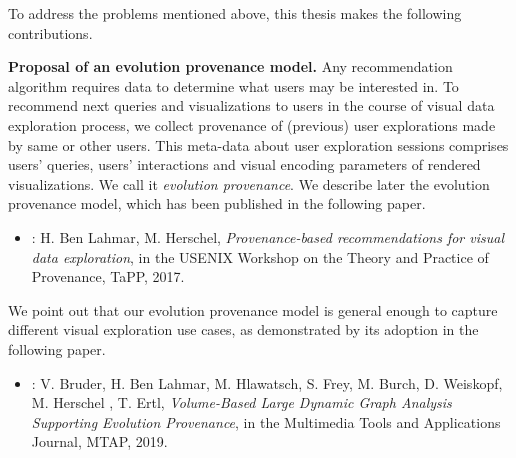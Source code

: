 
To address the problems mentioned above, this thesis makes the following contributions.

\bigskip 
\noindent \textbf{Proposal of an evolution provenance model.} 
Any recommendation algorithm requires data to determine what users may be interested in. To recommend next queries and visualizations to users in the course of visual data exploration process, we collect provenance of (previous) user explorations made by same or other users. 
This meta-data about user exploration sessions comprises users' queries, users' interactions and visual encoding parameters of rendered visualizations. We call it \emph{evolution provenance}.
We describe later the evolution provenance model, which has been published in the following paper.
\begin{itemize}
\item \cite{Houssem:17:tapp}: H. Ben Lahmar, M. Herschel, \emph{Provenance-based recommendations for visual data exploration}, in the USENIX Workshop on the Theory and Practice of Provenance, TaPP, 2017.

\end{itemize}
We point out that our evolution provenance model is general enough to capture different visual exploration use cases, as demonstrated by its adoption in the following paper.

\begin{itemize}
\item \cite{Bruder2019}: V. Bruder, H. Ben Lahmar, M. Hlawatsch, S. Frey, M. Burch, D. Weiskopf, M. Herschel , T. Ertl, \emph{Volume-Based Large Dynamic Graph Analysis Supporting Evolution Provenance}, in the Multimedia Tools and Applications Journal, MTAP, 2019.
\end{itemize}
 

